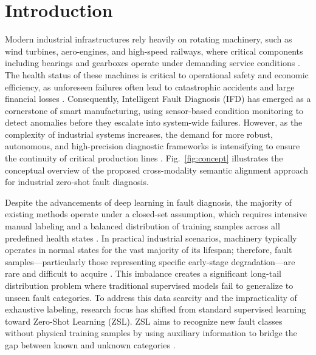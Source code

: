 \section{Introduction}
Modern industrial infrastructures rely heavily on rotating machinery, such as wind turbines, aero-engines, and high-speed railways, where critical components including bearings and gearboxes operate under demanding service conditions \cite{zhai2021multi}. The health status of these machines is critical to operational safety and economic efficiency, as unforeseen failures often lead to catastrophic accidents and large financial losses \cite{lei2020applications}. Consequently, Intelligent Fault Diagnosis (IFD) has emerged as a cornerstone of smart manufacturing, using sensor-based condition monitoring to detect anomalies before they escalate into system-wide failures. However, as the complexity of industrial systems increases, the demand for more robust, autonomous, and high-precision diagnostic frameworks is intensifying to ensure the continuity of critical production lines \cite{li2020deep}. Fig.~\ref{fig:concept} illustrates the conceptual overview of the proposed cross-modality semantic alignment approach for industrial zero-shot fault diagnosis.

Despite the advancements of deep learning in fault diagnosis, the majority of existing methods operate under a closed-set assumption, which requires intensive manual labeling and a balanced distribution of training samples across all predefined health states \cite{zhang2022digital}. In practical industrial scenarios, machinery typically operates in normal states for the vast majority of its lifespan; therefore, fault samples---particularly those representing specific early-stage degradation---are rare and difficult to acquire \cite{liu2018zero}. This imbalance creates a significant long-tail distribution problem where traditional supervised models fail to generalize to unseen fault categories. To address this data scarcity and the impracticality of exhaustive labeling, research focus has shifted from standard supervised learning toward Zero-Shot Learning (ZSL). ZSL aims to recognize new fault classes without physical training samples by using auxiliary information to bridge the gap between known and unknown categories \cite{wang2019zero, socher2013zero}.

